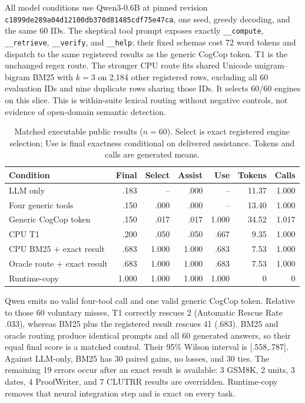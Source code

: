 \documentclass[10pt]{article}
\begin{document}
All model conditions use Qwen3-0.6B at pinned revision
\texttt{c1899de289a04d12100db370d81485cdf75e47ca}, one seed, greedy decoding,
and the same 60 IDs.  The skeptical tool prompt exposes exactly
\texttt{\_\_compute}, \texttt{\_\_retrieve}, \texttt{\_\_verify}, and
\texttt{\_\_help}; their fixed schemas cost 72 word tokens and dispatch to the
same registered results as the generic CogCop token.  T1 is the unchanged
regex route.  The stronger CPU route fits shared Unicode unigram--bigram BM25
with $k=3$ on 2,184 other registered rows, excluding all 60 evaluation IDs and
nine duplicate rows sharing those IDs.  It selects 60/60 engines on this slice.
This is within-suite lexical routing without negative controls, not evidence of
open-domain semantic detection.

\begin{table}[ht]
\centering\scriptsize
\caption{Matched executable public results ($n=60$). Select is exact registered
engine selection; Use is final exactness conditional on delivered assistance.
Tokens and calls are generated means.}
\label{tab:public-executable}
\begin{tabular}{@{}lrrrrrr@{}}
\toprule
Condition & Final & Select & Assist & Use & Tokens & Calls\\
\midrule
LLM only & .183 & -- & .000 & -- & 11.37 & 1.000\\
Four generic tools & .150 & .000 & .000 & -- & 13.40 & 1.000\\
Generic CogCop token & .150 & .017 & .017 & 1.000 & 34.52 & 1.017\\
CPU T1 & .200 & .050 & .050 & .667 & 9.35 & 1.000\\
CPU BM25 + exact result & .683 & 1.000 & 1.000 & .683 & 7.53 & 1.000\\
Oracle route + exact result & .683 & 1.000 & 1.000 & .683 & 7.53 & 1.000\\
Runtime-copy & 1.000 & 1.000 & 1.000 & 1.000 & 0 & 0\\
\bottomrule
\end{tabular}
\end{table}

Qwen emits no valid four-tool call and one valid generic CogCop token.  Relative
to those 60 voluntary misses, T1 correctly rescues 2 (Automatic Rescue Rate
.033), whereas BM25 plus the registered result rescues 41 (.683).  BM25 and
oracle routing produce identical prompts and all 60 generated answers, so their
equal final score is a matched control.  Their 95\% Wilson interval is
[.558,.787].  Against LLM-only, BM25 has 30 paired gains, no losses, and 30 ties.
The remaining 19 errors occur after an exact result is available: 3 GSM8K, 2
units, 3 dates, 4 ProofWriter, and 7 CLUTRR results are overridden.  Runtime-copy
removes that neural integration step and is exact on every task.
\end{document}
